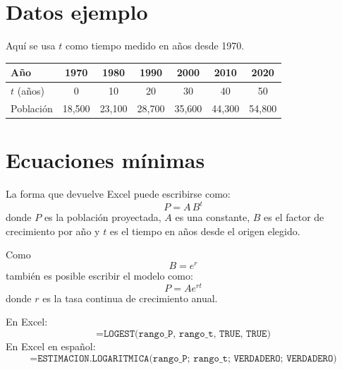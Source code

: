 \documentclass[12pt]{article}
\begin{document}

\section{Datos ejemplo}
Aquí se usa $t$ como tiempo medido en años desde 1970.

\begin{center}
\begin{tabular}{lcccccc}
\toprule
Año & 1970 & 1980 & 1990 & 2000 & 2010 & 2020 \\
\midrule
$t$ (años) & 0 & 10 & 20 & 30 & 40 & 50 \\
Población & 18,500 & 23,100 & 28,700 & 35,600 & 44,300 & 54,800 \\
\bottomrule
\end{tabular}
\end{center}

\section{Ecuaciones mínimas}
La forma que devuelve Excel puede escribirse como:
\begin{equation}
P=A\,B^t
\end{equation}
donde $P$ es la población proyectada, $A$ es una constante, $B$ es el factor de crecimiento por año y $t$ es el tiempo en años desde el origen elegido.

Como
\begin{equation}
B=e^r
\end{equation}
también es posible escribir el modelo como:
\begin{equation}
P=Ae^{rt}
\end{equation}
donde $r$ es la tasa continua de crecimiento anual.

En Excel:
\[
\texttt{=LOGEST(rango\_P, rango\_t, TRUE, TRUE)}
\]
En Excel en español:
\[
\texttt{=ESTIMACION.LOGARITMICA(rango\_P; rango\_t; VERDADERO; VERDADERO)}
\]

\end{document}
